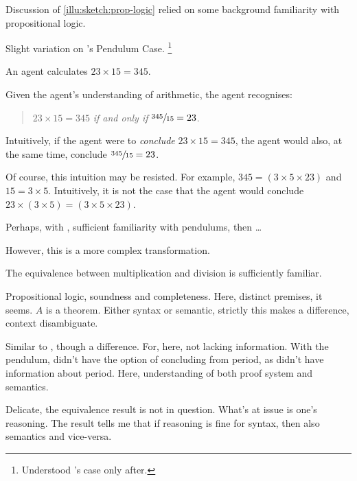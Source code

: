 \begin{note}
  Discussion of \autoref{illu:sketch:prop-logic} relied on some background familiarity with propositional logic.


  Slight variation on \citeauthor{Tolliver:1982us}'s Pendulum Case.%
  \footnote{
    Understood \citeauthor{Tolliver:1982us}'s case only after.
  }

  \begin{illustration}
    \label{illu:sketch:math}
    An agent calculates \(23 \times 15 = 345\).

    Given the agent's understanding of arithmetic, the agent recognises:
    \begin{quote}
      \(23 \times 15 = 345\) \emph{if and only if} \(\sfrac{345}{15} = 23\).
    \end{quote}
  \end{illustration}

  Intuitively, if the agent were to \emph{conclude} \(23 \times 15 = 345\), the agent would also, at the same time, conclude \(\sfrac{345}{15} = 23\).

  Of course, this intuition may be resisted.
  For example, \(345 = (3 \times 5 \times 23)\) and \(15 = 3 \times 5\).
  Intuitively, it is not the case that the agent would conclude \(23 \times (3 \times 5) = (3 \times 5 \times 23)\).

  Perhaps, with \citeauthor{Tolliver:1982us}, sufficient familiarity with pendulums, then \dots

  However, this is a more complex transformation.

  The equivalence between multiplication and division is sufficiently familiar.
  
\end{note}


\begin{note}[Interest]
  Propositional logic, soundness and completeness.
  Here, distinct premises, it seems.
  \(A\) is a theorem.
  Either syntax or semantic, strictly this makes a difference, context disambiguate.

  Similar to \citeauthor{Tolliver:1982us}, though a difference.
  For, here, not lacking information.
  With the pendulum, didn't have the option of concluding from period, as didn't have information about period.
  Here, understanding of both proof system and semantics.

  Delicate, the equivalence result is not in question.
  What's at issue is one's reasoning.
  The result tells me that if reasoning is fine for syntax, then also semantics and vice-versa.
\end{note}

